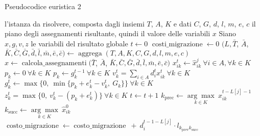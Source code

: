 \begin{algorithm}
    \caption{Pseudocodice euristica 2}
    \label{alg:euristica-modello}
    \begin{algorithmic}[1]
        \Require l'istanza da risolvere, composta dagli insiemi $T$, $A$, $K$ e dati $C$, $G$, $d$, $l$, $m$, $e$, $c$
        \Ensure il piano degli assegnamenti risultante, quindi il valore delle variabili $x$
        \State Siano $x, g, v, z$ le variabili del risultato globale
        \State $t \gets 0$
        \State $\operatorname{costi\_migrazione} \gets 0$
        \State $(L, \bar{T}$, $\bar{A}$, $\bar{K}, \bar{C}, \bar{G}, \bar{d}, \bar{l}, \bar{m}, \bar{e}, \bar{c}) \gets \operatorname{aggrega}(T, A, K, C, G, d, l, m, e, c)$ \label{algo1:l:aggrega}
        \State $\hat{x} \gets \operatorname{calcola\_assegnamenti}(\bar{T}$, $\bar{A}$, $\bar{K}, \bar{C}, \bar{G}, \bar{d}, \bar{l}, \bar{m}, \bar{e}, \bar{c})$
                \State $x^t_{ik} \gets \hat{x}^j_{ik} ~ \forall i \in A, \forall k \in K$
                    \State $p_k \gets 0 ~ \forall k \in K$
                \Else
                    \State $p_k \gets g^{t-1}_k ~ \forall k \in K$
                \EndIf
                \State $v^t_k = \sum_{i \in A} d^t_i x^t_{ik} ~ \forall k \in K$
                \State $g^t_k \gets \max\{0, ~ \min\{p_k + e^t_k- v^t_k, ~ G_k\}\} ~ \forall k \in K$
                \State $z^t_k = \max\{0, ~ v^t_k - \left(p_k + e^t_k\right)\} ~ \forall k \in K$
                \State $t \gets t + 1$
            \EndFor
                \State $k_{\operatorname{prec}} \gets \underset{k \in K}{\arg\max} ~ x^{t-L[j]-1}_{ik}$
                \State $k_{\operatorname{succ}} \gets \underset{k \in K}{\arg\max} ~ \hat{x}^0_{ik}$
                    \State $\operatorname{costo\_migrazione} \gets \operatorname{costo\_migrazione} ~ + ~ d^{t-1-L[j]}_i \cdot l_{k_{\operatorname{prev}} k_{\operatorname{succ}}}$
                \EndIf
            \EndFor
            \EndIf
        \EndFor
    \end{algorithmic}
\end{algorithm}
